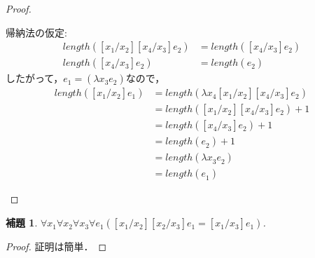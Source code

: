 \documentclass{ltjsbook}%
\newtheorem{lemma}{補題}[section]%
\begin{document}
\begin{proof}
\begin{itemize}
    帰納法の仮定:%
    \begin{align}%
      length([\mathit{x}_1^{}/\mathit{x}_2^{}][\mathit{x}_4^{}/\mathit{x}_3^{}]\mathit{e}_2^{})%
      &=length([\mathit{x}_4^{}/\mathit{x}_3^{}]\mathit{e}_2^{})\\%
      length([\mathit{x}_4^{}/\mathit{x}_3^{}]\mathit{e}_2^{})%
      &=length(\mathit{e}_2^{})%
    \end{align}%
    したがって，$\mathit{e}_1^{}=(\lambda\mathit{x}_3^{}\mathit{e}_2^{})$なので，%
    \begin{align}%
    length([\mathit{x}_1^{}/\mathit{x}_2^{}]\mathit{e}_1^{})%
    &=length(\lambda\mathit{x}_4^{}[\mathit{x}_1^{}/\mathit{x}_2^{}][\mathit{x}_4^{}/\mathit{x}_3^{}]\mathit{e}_2^{})\\%
    &=length([\mathit{x}_1^{}/\mathit{x}_2^{}][\mathit{x}_4^{}/\mathit{x}_3^{}]\mathit{e}_2^{})+1\\%
    &=length([\mathit{x}_4^{}/\mathit{x}_3^{}]\mathit{e}_2^{})+1\\%
    &=length(\mathit{e}_2^{})+1\\%
    &=length(\lambda\mathit{x}_3^{}\mathit{e}_2^{})\\%
    &=length(\mathit{e}_1^{})%
    \end{align}%
  \end{itemize}%
\end{proof}%
\begin{lemma}%
  \label{lemma:subst_trans}%
  $\forall\mathit{x}_1^{}\forall\mathit{x}_2^{}\forall\mathit{x}_3^{}\forall\mathit{e}_1^{}%
  ([\mathit{x}_1^{}/\mathit{x}_2^{}][\mathit{x}_2^{}/\mathit{x}_3^{}]\mathit{e}_1^{}%
  =[\mathit{x}_1^{}/\mathit{x}_3^{}]\mathit{e}_1^{})$.%
\end{lemma}%
\begin{proof}%
  証明は簡単．%
\end{proof}%
\end{document}
